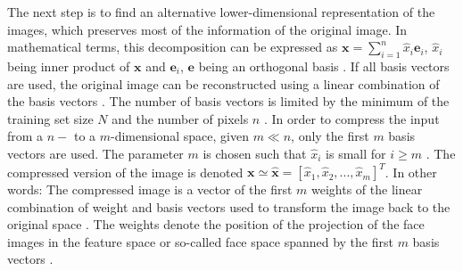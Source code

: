 The next step is to find an alternative lower-dimensional representation of the images, which preserves most of the information of the original image.
In mathematical terms, this decomposition can be expressed as 
$\textbf{x} = \sum_{i=1}^{n}\hat{x}_{i} \textbf{e}_{i}$, 
$\hat{x}_{i}$ being inner product of $\textbf{x}$ and $\textbf{e}_{i}$, 
$\textbf{e}$ being an orthogonal basis 
\cite{eigenfaces1997}.
If all basis vectors are used, the original image can be reconstructed using a linear combination of the basis vectors \cite{eigenfaces1991, face-recognition2020}.
The number of basis vectors is limited by the minimum of the training set size $N$ \cite{eigenfaces1991} and the number of pixels $n$ \cite{face-recognition2020}.
In order to compress the input from a $n-$ to a $m$-dimensional space, given $m \ll n$, only the first $m$ basis vectors are used.
The parameter $m$ is chosen such that $\hat{x}_{i}$ is small for $i \ge m$ \cite{eigenfaces1997}.
The compressed version of the image is denoted $\textbf{x} \simeq \hat{\textbf{x}} = \left[\hat{x}_{1}, \hat{x}_{2}, ..., \hat{x}_{m}  \right]^{T}$.
In other words: 
The compressed image is a vector of the first $m$ weights of the linear combination of weight and basis vectors used to transform the image back to the original space \cite{eigenfaces1991}.
The weights denote the position of the projection of the face images in the feature space or so-called face space spanned by the first $m$ basis vectors \cite{eigenfaces1991}.

